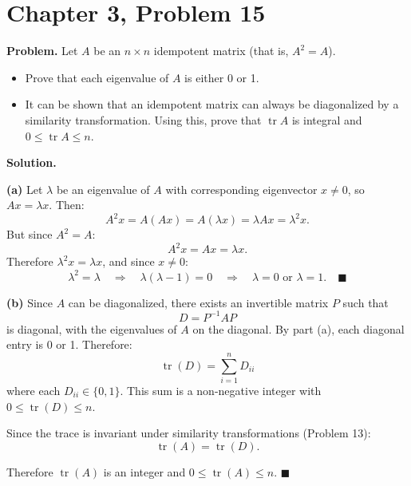 \documentclass[12pt]{article}
\begin{document}
\section*{Chapter 3, Problem 15}

\textbf{Problem.} Let $A$ be an $n \times n$ idempotent matrix (that is, $A^2 = A$).
\begin{itemize}
    \item[(a)] Prove that each eigenvalue of $A$ is either 0 or 1.
    \item[(b)] It can be shown that an idempotent matrix can always be diagonalized by a similarity transformation. Using this, prove that $\operatorname{tr} A$ is integral and $0 \le \operatorname{tr} A \le n$.
\end{itemize}

\bigskip
\textbf{Solution.}

\textbf{(a)} Let $\lambda$ be an eigenvalue of $A$ with corresponding eigenvector $x \neq 0$, so $Ax = \lambda x$. Then:
\[
A^2 x = A(Ax) = A(\lambda x) = \lambda Ax = \lambda^2 x.
\]
But since $A^2 = A$:
\[
A^2 x = Ax = \lambda x.
\]
Therefore $\lambda^2 x = \lambda x$, and since $x \neq 0$:
\[
\lambda^2 = \lambda \quad \Longrightarrow \quad \lambda(\lambda - 1) = 0 \quad \Longrightarrow \quad \lambda = 0 \text{ or } \lambda = 1. \quad \blacksquare
\]

\medskip
\textbf{(b)} Since $A$ can be diagonalized, there exists an invertible matrix $P$ such that
\[
D = P^{-1}AP
\]
is diagonal, with the eigenvalues of $A$ on the diagonal. By part (a), each diagonal entry is 0 or 1. Therefore:
\[
\operatorname{tr}(D) = \sum_{i=1}^{n} D_{ii}
\]
where each $D_{ii} \in \{0, 1\}$. This sum is a non-negative integer with $0 \le \operatorname{tr}(D) \le n$.

Since the trace is invariant under similarity transformations (Problem 13):
\[
\operatorname{tr}(A) = \operatorname{tr}(D).
\]

Therefore $\operatorname{tr}(A)$ is an integer and $0 \le \operatorname{tr}(A) \le n$. \hfill $\blacksquare$
\end{document}
